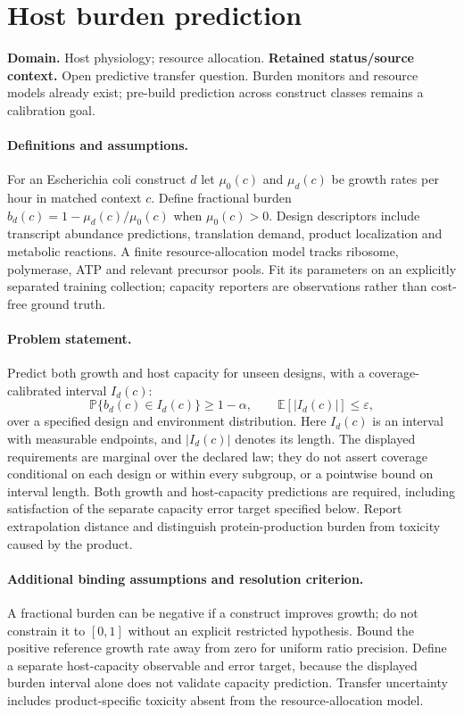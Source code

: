 \documentclass[11pt]{article}
\begin{document}
\section*{Host burden prediction}
\label{prob:263}
\label{rank:183}
\par\smallskip

\noindent\textbf{Domain.} Host physiology; resource allocation. \quad \textbf{Retained status/source context.} Open predictive transfer question. Burden monitors and resource models already exist; pre-build prediction across construct classes remains a calibration goal.

\paragraph{Definitions and assumptions.} For an Escherichia coli construct $d$ let $\mu_0(c)$ and $\mu_d(c)$ be growth rates per hour in matched context $c$. Define fractional burden $b_d(c)=1-\mu_d(c)/\mu_0(c)$ when $\mu_0(c)>0$. Design descriptors include transcript abundance predictions, translation demand, product localization and metabolic reactions. A finite resource-allocation model tracks ribosome, polymerase, ATP and relevant precursor pools. Fit its parameters on an explicitly separated training collection; capacity reporters are observations rather than cost-free ground truth.

\paragraph{Problem statement.} Predict both growth and host capacity for unseen designs, with a coverage-calibrated interval $I_d(c)$:
\[
\mathbb{P}\{b_d(c)\in I_d(c)\}\geq1-\alpha,
\qquad\mathbb{E}[|I_d(c)|]\leq\varepsilon,
\]
over a specified design and environment distribution. Here $I_d(c)$ is an interval with measurable endpoints, and $|I_d(c)|$ denotes its length. The displayed requirements are marginal over the declared law; they do not assert coverage conditional on each design or within every subgroup, or a pointwise bound on interval length. Both growth and host-capacity predictions are required, including satisfaction of the separate capacity error target specified below. Report extrapolation distance and distinguish protein-production burden from toxicity caused by the product.

\paragraph{Additional binding assumptions and resolution criterion.} A fractional burden can be negative if a construct improves growth; do not constrain it to $[0,1]$ without an explicit restricted hypothesis. Bound the positive reference growth rate away from zero for uniform ratio precision. Define a separate host-capacity observable and error target, because the displayed burden interval alone does not validate capacity prediction. Transfer uncertainty includes product-specific toxicity absent from the resource-allocation model.
\end{document}
